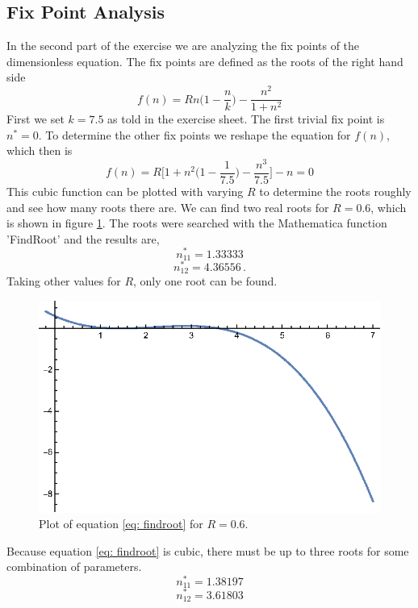 \documentclass[11pt, a4paper, reqno]{scrartcl}
\begin{document}
	\subsection{Fix Point Analysis}
		 In the second part of the exercise we are analyzing the fix points of the dimensionless equation.
		 The fix points are defined as the roots of the right hand side
		 \[
		 f(n) = R n \bigg(1 - \frac{n}{k} \bigg) - \frac{n^2}{1 + n^2} \]
		 First we set $k = 7.5$ as told in the exercise sheet.
		 The first trivial fix point is $n^{\ast} = 0$.
		 To determine the other fix points we reshape the equation for $f(n)$, which then is
		 \begin{equation}
		 f(n) = R \bigg[1 + n^2 \bigg(1 - \frac{1}{7.5} \bigg) - \frac{n^3}{7.5} \bigg] - n = 0
		 \label{eq: findroot}
		 \end{equation}
		 This cubic function can be plotted with varying $R$ to determine the roots roughly and see how many roots there are.
		 We can find two real roots for $R = 0.6$, which is shown in figure \ref{fig: 1}.
		 The roots were searched with the Mathematica function 'FindRoot' and the results are, 
		 \[
		 n^{\ast}_{11} = 1.33333\]
		 \[
		 n^{\ast}_{12} = 4.36556\, .\]
		 Taking other values for $R$, only one root can be found. 
		 \begin{figure}[H]
		 	\centering
		 	\includegraphics[]{CompPhys_6-2_gr1.eps}
		 	\caption{Plot of equation \eqref{eq: findroot} for $R = 0.6$.}
		 	\label{fig: 1}
		 \end{figure}
	 
	 	 Because equation \eqref{eq: findroot} is cubic, there must be up to three roots for some combination of parameters.
	 	 \[n^{\ast}_{11} = 1.38197\]
	 	 \[n^{\ast}_{12} = 3.61803\]
	 	 
\end{document}

